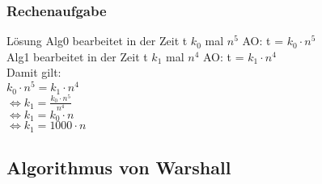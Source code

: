 \documentclass{beamer}
\begin{document}
\begin{frame}
	\frametitle{Rechenaufgabe}
	\begin{block}{L\"osung}
	Alg0 bearbeitet in der Zeit t $k_0$ mal $n^5$ AO: t = $k_0 \cdot n^5$\\
	Alg1 bearbeitet in der Zeit t $k_1$ mal $n^4$ AO: t = $ k_1 \cdot n^4$ \\
	Damit gilt: \\
	\hspace{5 cm} $k_0 \cdot n^5 = k_1 \cdot n^4 $ \\
	\hspace{5 cm} $\Leftrightarrow k_1 = \frac{k_0 \cdot n^5}{n^4} $\\
	\hspace{5 cm} $\Leftrightarrow k_1 = k_0 \cdot n$\\
	\hspace{5 cm} $\Leftrightarrow k_1 = 1000 \cdot n$

	\end{block}
\end{frame}

\subsection{Algorithmus von Warshall}
\end{document}
